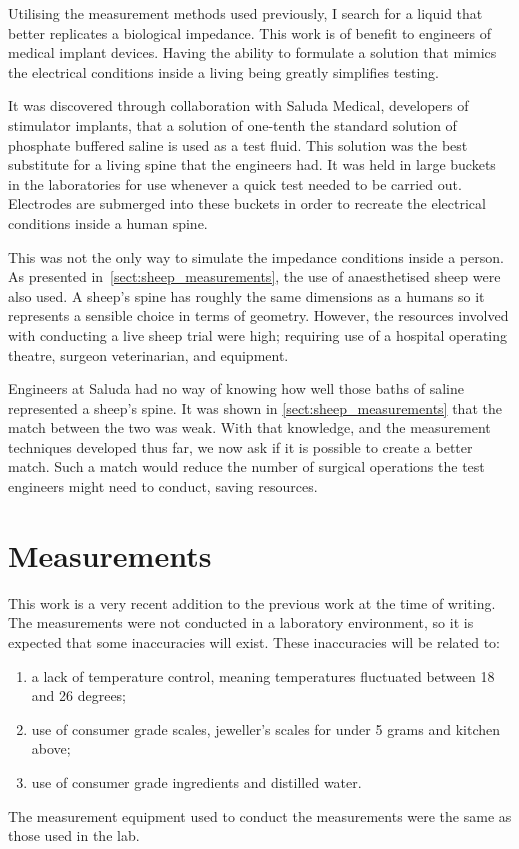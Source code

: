 
Utilising the measurement methods used previously, I search for a liquid that better replicates a biological impedance.
This work is of benefit to engineers of medical implant devices.
Having the ability to formulate a solution that mimics the electrical conditions inside a living being greatly simplifies testing.

It was discovered through collaboration with Saluda Medical, developers of stimulator implants, that a solution of one-tenth the standard solution of phosphate buffered saline is used as a test fluid.
This solution was the best substitute for a living spine that the engineers had.
It was held in large buckets in the laboratories for use whenever a quick test needed to be carried out.
Electrodes are submerged into these buckets in order to recreate the electrical conditions inside a human spine.

This was not the only way to simulate the impedance conditions inside a person.
As presented in~\cref{sect:sheep_measurements}, the use of anaesthetised sheep were also used.
A sheep's spine has roughly the same dimensions as a humans so it represents a sensible choice in terms of geometry.
However, the resources involved with conducting a live sheep trial were high; requiring use of a hospital operating theatre, surgeon veterinarian, and equipment.

Engineers at Saluda had no way of knowing how well those baths of saline represented a sheep's spine.
It was shown in \cref{sect:sheep_measurements} that the match between the two was weak.
With that knowledge, and the measurement techniques developed thus far, we now ask if it is possible to create a better match.
Such a match would reduce the number of surgical operations the test engineers might need to conduct, saving resources.


\section{Measurements}

This work is a very recent addition to the previous work at the time of writing.
The measurements were not conducted in a laboratory environment, so it is expected that some inaccuracies will exist.
These inaccuracies will be related to:
\begin{enumerate}
    \item a lack of temperature control, meaning temperatures fluctuated between 18 and 26 degrees;
    \item use of consumer grade scales, jeweller's scales for under 5 grams and kitchen above;
    \item use of consumer grade ingredients and distilled water.
\end{enumerate}
The measurement equipment used to conduct the measurements were the same as those used in the lab.

